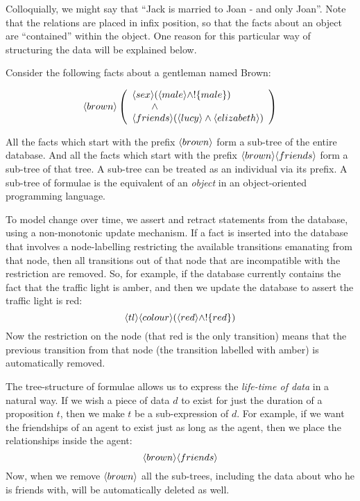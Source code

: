 \NI Colloquially, we might say that ``Jack is
married to Joan - and only Joan''.  Note that the  relations are
placed in infix position,  so that the facts about an object are
``contained'' within the object.   
One reason for this particular way of structuring the data will be explained below.
 
Consider the following facts about a gentleman named Brown:

\[
   \langle brown \rangle \left(
   \begin{array}{l}
     \langle sex \rangle (\langle male \rangle \land ! \{male\}) \\
        \qquad \land \\
     \langle friends \rangle (\langle lucy \rangle \land \langle elizabeth \rangle ) 
   \end{array}
   \right)
\]

\NI All the facts which start with the prefix $\MAY{brown}$ form a
sub-tree of the entire database.  And all the facts which start with
the prefix $\MAY{brown} \MAY{friends}$ form a sub-tree of that tree.
A sub-tree can be treated as an individual via its prefix.  
A sub-tree of formulae is the \cathoristic{} equivalent of an
\emph{object} in an object-oriented programming language.

To model change over time, we assert and retract statements from the database, using a non-monotonic update mechanism.
If a fact is inserted into the database that involves a node-labelling restricting the available transitions emanating from that node, then all transitions out of that node that are incompatible with the restriction are removed.
So, for example, if the database currently contains the fact that the traffic light is amber, and then we update the database to assert the traffic light is red:
\[
\langle tl \rangle \langle colour \rangle (\langle red \rangle \land !\{red\})
\]
Now the restriction on the node (that red is the only transition) means that the previous transition from that node (the transition labelled with amber) is automatically removed.

The tree-structure of formulae allows us to express the \emph{life-time of data} in a natural way. 
If we wish a piece of data $d$ to exist for just the duration of a proposition $t$, then we make $t$ be a sub-expression of $d$. 
For example, if we want the friendships of an agent to exist just as long as the agent, then we place the relationships inside the agent: 
\[
\langle brown \rangle \langle friends \rangle \]
Now, when we remove $\MAY{brown}$ all the sub-trees, including the data about who he is friends with, will be automatically deleted as well.

